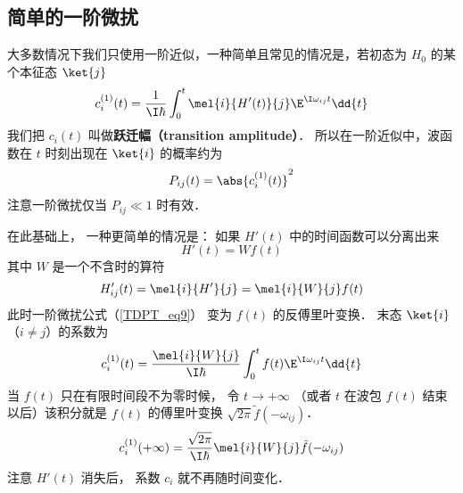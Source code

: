 \subsection{简单的一阶微扰}
大多数情况下我们只使用一阶近似，一种简单且常见的情况是，若初态为 $H_0$ 的某个本征态 $\ket{j}$
\begin{equation}
c_i^{(1)}(t) = \frac{1}{\I\hbar} \int_0^t \mel{i}{H'(t)}{j} \E^{\I\omega_{ij} t} \dd{t}
\end{equation}
我们把 $c_i(t)$ 叫做\textbf{跃迁幅（transition amplitude）}． 所以在一阶近似中，波函数在 $t$ 时刻出现在 $\ket{i}$ 的概率约为
\begin{equation}
P_{ij}(t) = \abs{c_i^{(1)}(t)}^2
\end{equation}
注意一阶微扰仅当 $P_{ij} \ll 1$ 时有效．

在此基础上， 一种更简单的情况是： 如果 $H'(t)$ 中的时间函数可以分离出来
\begin{equation}
H'(t) = W f(t)
\end{equation}
其中 $W$ 是一个不含时的算符
\begin{equation}
H'_{ij}(t) = \mel{i}{H'}{j} = \mel{i}{W}{j}f(t)
\end{equation}
此时一阶微扰公式（\autoref{TDPT_eq9}） 变为 $f(t)$ 的反傅里叶变换． 末态 $\ket{i}$ （$i \neq j$）的系数为
\begin{equation}
c_i^{(1)}(t) = \frac{\mel{i}{W}{j}}{\I\hbar} \int_0^t f(t)\E^{\I\omega_{ij} t} \dd{t}
\end{equation}
当 $f(t)$ 只在有限时间段不为零时候， 令 $t\to+\infty$ （或者 $t$ 在波包 $f(t)$ 结束以后）该积分就是 $f(t)$ 的傅里叶变换 $\sqrt{2\pi}\tilde f(-\omega_{ij})$．
\begin{equation}
c_i^{(1)}(+\infty) = \frac{\sqrt{2\pi}}{\I\hbar} \mel{i}{W}{j}\tilde f(-\omega_{ij})
\end{equation}
注意 $H'(t)$ 消失后， 系数 $c_i$ 就不再随时间变化．
